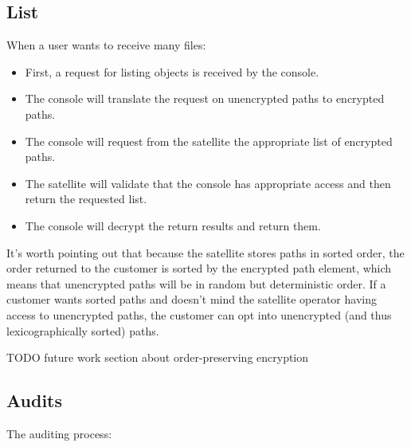 \documentclass[11pt,fleqn,openany]{book}
\newcommand{\todo}[1]{{\color{red} TODO #1 }}
\begin{document}
\subsection{List}

When a user wants to receive many files:

\begin{itemize}
\item First, a request for listing objects is received by the console.
\item The console will translate the request on unencrypted paths to encrypted
  paths.
\item The console will request from the satellite the appropriate list of
  encrypted paths.
\item The satellite will validate that the console has appropriate access
  and then return the requested list.
\item The console will decrypt the return results and return them.
\end{itemize}

It's worth pointing out that because the satellite stores paths in sorted
order, the order returned to the customer is sorted by the encrypted
path element, which means that unencrypted paths will be in random but
deterministic order. If a customer wants sorted paths and doesn't mind the
satellite operator having access to unencrypted paths, the customer can opt
into unencrypted (and thus lexicographically sorted) paths.

\todo{future work section about order-preserving encryption}

\subsection{Audits}

The auditing process:
\end{document}
